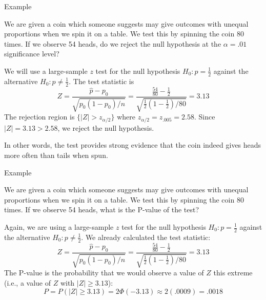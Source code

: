 \documentclass[t,handout]{beamer}
\begin{document}
\begin{frame}{Example}
    \begin{block}{}
        We are given a coin which someone suggests may give outcomes with unequal proportions when we spin it on a table. We test this by spinning the coin 80 times. If we observe 54 heads, do we reject the null hypothesis at the $\alpha=.01$ significance level?
    \end{block}
    \pause We will use a large-sample $z$ test for the null hypothesis $H_0: p=\frac12$ against the alternative $H_0: p\neq\frac12$. \pause The test statistic is
    $$Z=\frac{\hat p-p_0}{\sqrt{p_0(1-p_0)/n}}=\frac{\frac{54}{80}-\frac12}{\sqrt{\frac12(1-\frac12)/80}}=3.13$$
    \pause The rejection region is $\{|Z|>z_{\alpha/2}\}$ where $z_{\alpha/2}=z_{.005}=2.58$. \pause Since $|Z|=3.13>2.58$, we reject the null hypothesis.

    \vspace{.2cm}
    \pause In other words, the test provides strong evidence that the coin indeed gives heads more often than tails when spun.
\end{frame}

\begin{frame}{Example}
    \begin{block}{}
        We are given a coin which someone suggests may give outcomes with unequal proportions when we spin it on a table. We test this by spinning the coin 80 times. If we observe 54 heads, what is the P-value of the test?
    \end{block}
    \pause Again, we are using a large-sample $z$ test for the null hypothesis $H_0: p=\frac12$ against the alternative $H_0: p\neq\frac12$. \pause We already calculated the test statistic:
    $$Z=\frac{\hat p-p_0}{\sqrt{p_0(1-p_0)/n}}=\frac{\frac{54}{80}-\frac12}{\sqrt{\frac12(1-\frac12)/80}}=3.13$$
    \pause The P-value is the probability that we would observe a value of $Z$ this extreme (i.e., a value of $Z$ with $|Z|\geq 3.13$):
    $$ P = P(|Z|\geq 3.13) = 2\Phi(-3.13) \approx 2(.0009) = .0018$$

\end{frame}
\end{document}
